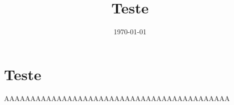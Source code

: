 \documentclass[12pt]{article}
\begin{document}
\title{Teste}

\date{\today}

\section{Teste}

AAAAAAAAAAAAAAAAAAAAAAAAAAAAAAAAAAAAAAAAAAA
\end{document}
